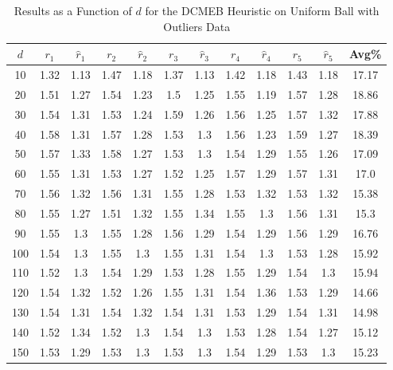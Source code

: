 \documentclass[11pt,twoside]{report}
\theoremstyle{definition}
\numberwithin{theorem}{section}
\numberwithin{definition}{section}
\numberwithin{lemma}{section}
\numberwithin{proposition}{section}
\numberwithin{equation}{section}
\numberwithin{figure}{section}
\begin{document}
\begin{appendices}
    \begin{table}[ht]
        \centering
        \begin{tabular}{|c||cc||cc||cc||cc||cc||c|} \hline
            $d$&$r_1$&$\hat{r}_1$&$r_2$&$\hat{r}_2$&$r_3$&$\hat{r}_3$&$r_4$&$\hat{r}_4$&$r_5$&$\hat{r}_5$&Avg\% \\ \hline
            10&1.32&1.13&1.47&1.18&1.37&1.13&1.42&1.18&1.43&1.18&17.17 \\
            20&1.51&1.27&1.54&1.23&1.5&1.25&1.55&1.19&1.57&1.28&18.86 \\
            30&1.54&1.31&1.53&1.24&1.59&1.26&1.56&1.25&1.57&1.32&17.88 \\
            40&1.58&1.31&1.57&1.28&1.53&1.3&1.56&1.23&1.59&1.27&18.39 \\
            50&1.57&1.33&1.58&1.27&1.53&1.3&1.54&1.29&1.55&1.26&17.09 \\
            60&1.55&1.31&1.53&1.27&1.52&1.25&1.57&1.29&1.57&1.31&17.0 \\
            70&1.56&1.32&1.56&1.31&1.55&1.28&1.53&1.32&1.53&1.32&15.38 \\
            80&1.55&1.27&1.51&1.32&1.55&1.34&1.55&1.3&1.56&1.31&15.3 \\
            90&1.55&1.3&1.55&1.28&1.56&1.29&1.54&1.29&1.56&1.29&16.76 \\
            100&1.54&1.3&1.55&1.3&1.55&1.31&1.54&1.3&1.53&1.28&15.92 \\
            110&1.52&1.3&1.54&1.29&1.53&1.28&1.55&1.29&1.54&1.3&15.94 \\
            120&1.54&1.32&1.52&1.26&1.55&1.31&1.54&1.36&1.53&1.29&14.66 \\
            130&1.54&1.31&1.54&1.32&1.54&1.31&1.53&1.29&1.54&1.31&14.98 \\
            140&1.52&1.34&1.52&1.3&1.54&1.3&1.53&1.28&1.54&1.27&15.12 \\
            150&1.53&1.29&1.53&1.3&1.53&1.3&1.54&1.29&1.53&1.3&15.23 \\ \hline
        \end{tabular}
        \caption{Results as a Function of $d$ for the DCMEB Heuristic on Uniform Ball with Outliers Data}
        \label{tab:uniform_ball_with_outliers_dcmeb_table_d}
    \end{table}
    

\end{appendices}
\end{document}
